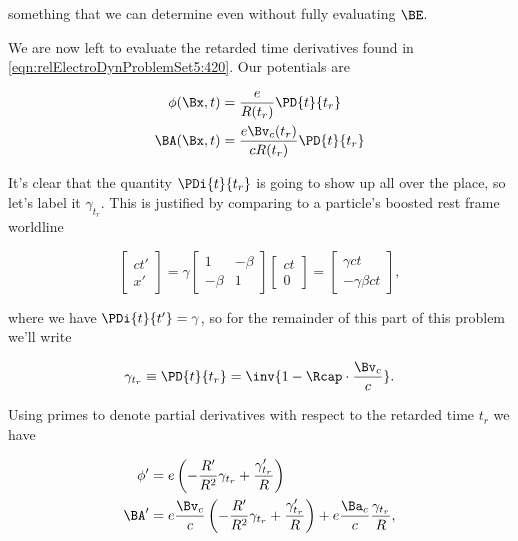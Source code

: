 something that we can determine even without fully evaluating $\BE$.

We are now left to evaluate the retarded time derivatives found in \ref{eqn:relElectroDynProblemSet5:420}.  Our potentials are

\begin{align}\label{eqn:relElectroDynProblemSet5:470}
\phi(\Bx, t) &= \frac{e}{R(t_r)} \PD{t}{t_r} \\
\BA(\Bx, t) &= \frac{e \Bv_c(t_r)}{c R(t_r)} \PD{t}{t_r}
\end{align}

It's clear that the quantity $\PDi{t}{t_r}$ is going to show up all over the place, so let's label it $\gamma_{t_r}$.  This is justified by comparing to a particle's boosted rest frame worldline

\begin{equation}\label{eqn:relElectroDynProblemSet5:260}
\begin{bmatrix}
c t' \\
x'
\end{bmatrix}
=
\gamma
\begin{bmatrix}
1 & -\beta \\
-\beta & 1
\end{bmatrix}
\begin{bmatrix}
c t \\
0
\end{bmatrix}
= 
\begin{bmatrix}
\gamma c t \\
-\gamma \beta c t
\end{bmatrix},
\end{equation}

where we have $\PDi{t}{t'} = \gamma$, so for the remainder of this part of this problem we'll write

\begin{equation}\label{eqn:relElectroDynProblemSet5:280}
\gamma_{t_r} \equiv \PD{t}{t_r} = \inv{ 1 -\Rcap \cdot \frac{\Bv_c}{c} }.
\end{equation}

Using primes to denote partial derivatives with respect to the retarded time $t_r$ we have

\begin{align}\label{eqn:relElectroDynProblemSet5:490}
\phi' &= e \left( -\frac{R'}{R^2} \gamma_{t_r} + \frac{\gamma_{t_r}'}{R} \right) \\
\BA' &= e \frac{\Bv_c}{c} \left( -\frac{R'}{R^2} \gamma_{t_r} + \frac{\gamma_{t_r}'}{R} \right)
+ e \frac{\Ba_c}{c} \frac{\gamma_{t_r}}{R},
\end{align}

